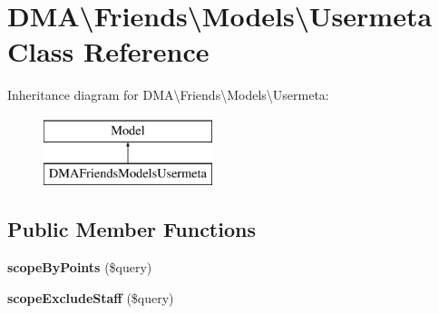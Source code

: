 \hypertarget{classDMA_1_1Friends_1_1Models_1_1Usermeta}{\section{D\-M\-A\textbackslash{}Friends\textbackslash{}Models\textbackslash{}Usermeta Class Reference}
\label{classDMA_1_1Friends_1_1Models_1_1Usermeta}
}
Inheritance diagram for D\-M\-A\textbackslash{}Friends\textbackslash{}Models\textbackslash{}Usermeta\-:\begin{figure}[H]
\begin{center}
\leavevmode
\includegraphics[height=2.000000cm]{d6/d87/classDMA_1_1Friends_1_1Models_1_1Usermeta}
\end{center}
\end{figure}
\subsection*{Public Member Functions}
\begin{DoxyCompactItemize}
\item 
\hypertarget{classDMA_1_1Friends_1_1Models_1_1Usermeta_ae00ecaf0d62b1ac7adc77184ae2fcbfa}{{\bfseries scope\-By\-Points} (\$query)}\label{classDMA_1_1Friends_1_1Models_1_1Usermeta_ae00ecaf0d62b1ac7adc77184ae2fcbfa}

\item 
\hypertarget{classDMA_1_1Friends_1_1Models_1_1Usermeta_a9b2ffa9c768ce6346269295d54d5cf4b}{{\bfseries scope\-Exclude\-Staff} (\$query)}\label{classDMA_1_1Friends_1_1Models_1_1Usermeta_a9b2ffa9c768ce6346269295d54d5cf4b}

\end{DoxyCompactItemize}
